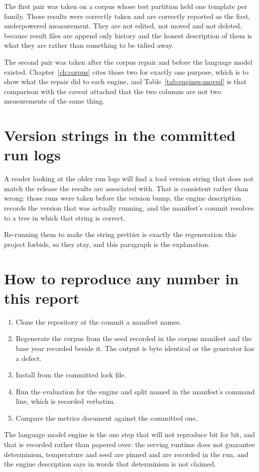 The first pair was taken on a corpus whose test partition held one template per
family. Those results were correctly taken and are correctly reported as the
first, underpowered measurement. They are not edited, not moved and not deleted,
because result files are append only history and the honest description of them
is what they are rather than something to be tidied away.

The second pair was taken after the corpus repair and before the language model
existed. Chapter~\ref{ch:corpus} cites those two for exactly one purpose, which
is to show what the repair did to each engine, and
Table~\ref{tab:engines-moved} is that comparison with the caveat attached that
the two columns are not two measurements of the same thing.

\section{Version strings in the committed run logs}

A reader looking at the older run logs will find a tool version string that does
not match the release the results are associated with. That is consistent rather
than wrong: those runs were taken before the version bump, the engine
description records the version that was actually running, and the manifest's
commit resolves to a tree in which that string is correct.

Re-running them to make the string prettier is exactly the regeneration this
project forbids, so they stay, and this paragraph is the explanation.

\section{How to reproduce any number in this report}

\begin{enumerate}
  \item Clone the repository at the commit a manifest names.
  \item Regenerate the corpus from the seed recorded in the corpus manifest and
    the base year recorded beside it. The output is byte identical or the
    generator has a defect.
  \item Install from the committed lock file.
  \item Run the evaluation for the engine and split named in the manifest's
    command line, which is recorded verbatim.
  \item Compare the metrics document against the committed one.
\end{enumerate}

The language model engine is the one step that will not reproduce bit for bit,
and that is recorded rather than papered over: the serving runtime does not
guarantee determinism, temperature and seed are pinned and are recorded in the
run, and the engine description says in words that determinism is not claimed.
